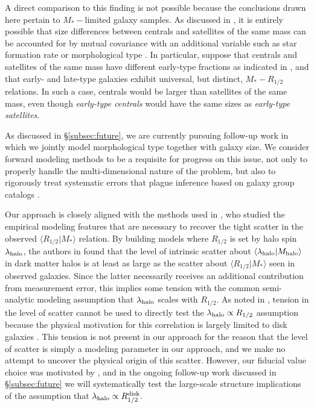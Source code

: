 \documentclass[usenatbib,usegraphicx,letterpaper]{mn2e}
\newcommand{\rhalf}{R_{1/2}}
\newcommand{\mstar}{M_{\ast}}
\newcommand{\mhalo}{M_{\rm halo}}
\begin{document}
A direct comparison to this finding is not possible because the conclusions drawn here pertain to $\mstar-$limited galaxy samples. As discussed in \citet{spindler_wake17}, it is entirely possible that size differences between centrals and satellites of the same mass can be accounted for by mutual covariance with an additional variable such as star formation rate or morphological type \citep[see also][for an explicit demonstration of this scenario]{lilly_carollo16}. In particular, suppose that centrals and satellites of the same mass have different early-type fractions as indicated in \citet{weinmann_etal06}, and that early- and late-type galaxies exhibit universal, but distinct, $\mstar-\rhalf$ relations. In such a case, centrals would be larger than satellites of the same mass, even though {\em early-type centrals} would have the same sizes as {\em early-type satellites}. 

As discussed in \S\ref{subsec:future}, we are currently pursuing follow-up work in which we jointly model morphological type together with galaxy size. We consider forward modeling methods to be a requisite for progress on this issue, not only to properly handle the multi-dimensional nature of the problem, but also to rigorously treat systematic errors that plague inference based on galaxy group catalogs \citep[see][for a thorough discussion]{campbell_etal15}. 

Our approach is closely aligned with the methods used in \citet{somerville_etal17}, who studied the empirical modeling features that are necessary to recover the tight scatter in the observed $\langle\rhalf\vert\mstar\rangle$ relation. By building models where $\rhalf$ is set by halo spin $\lambda_{\rm halo}$, the authors in \citet{somerville_etal17} found that the level of intrinsic scatter about $\langle\lambda_{\rm halo}\vert\mhalo\rangle$ in dark matter halos is at least as large as the scatter about $\langle\rhalf\vert\mstar\rangle$ seen in observed galaxies. Since the latter necessarily receives an additional contribution from measurement error, this implies some tension with the common semi-analytic modeling assumption that $\lambda_{\rm halo}$ scales with $\rhalf.$ As noted in \citet{somerville_etal17}, tension in the level of scatter cannot be used to directly test the $\lambda_{\rm halo}\propto\rhalf$ assumption because the physical motivation for this correlation is largely limited to disk galaxies \citep{mo_mao_white98}. This tension is not present in our approach for the reason that the level of scatter is simply a modeling parameter in our approach, and we make no attempt to uncover the physical origin of this scatter. However, our fiducial value choice was motivated by \citet{somerville_etal17}, and in the ongoing follow-up work discussed in \S\ref{subsec:future} we will systematically test the large-scale structure implications of the assumption that $\lambda_{\rm halo}\propto\rhalf^{\rm disk}.$
\end{document}
